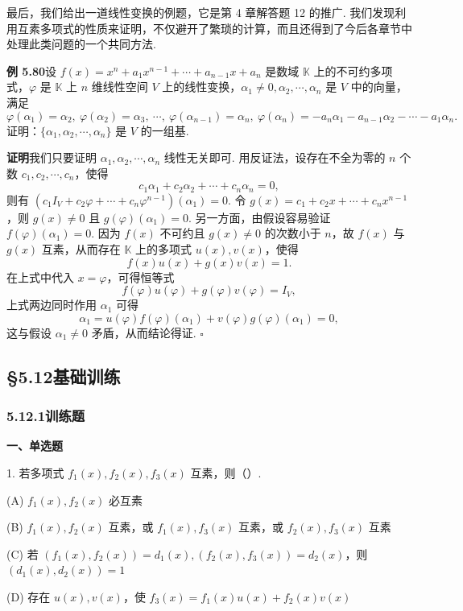 \documentclass[UTF8,12pt,a4paper,fontset=fandol]{ctexart}
\begin{document}
最后，我们给出一道线性变换的例题，它是第 4 章解答题 12 的推广. 我们发现利用互素多项式的性质来证明，不仅避开了繁琐的计算，而且还得到了今后各章节中处理此类问题的一个共同方法.

\noindent\textbf{例 5.80}\quad 设 $f(x)=x^n+a_1x^{n-1}+\cdots+a_{n-1}x+a_n$ 是数域 $\mathbb{K}$ 上的不可约多项式，$\varphi$ 是 $\mathbb{K}$ 上 $n$ 维线性空间 $V$ 上的线性变换，$\alpha_1\ne0,\alpha_2,\cdots,\alpha_n$ 是 $V$ 中的向量，满足
\[
\varphi(\alpha_1)=\alpha_2,\ \varphi(\alpha_2)=\alpha_3,\ \cdots,\ \varphi(\alpha_{n-1})=\alpha_n,\ \varphi(\alpha_n)=-a_n\alpha_1-a_{n-1}\alpha_2-\cdots-a_1\alpha_n.
\]
证明：$\{\alpha_1,\alpha_2,\cdots,\alpha_n\}$ 是 $V$ 的一组基.

\noindent\textbf{证明}\quad 我们只要证明 $\alpha_1,\alpha_2,\cdots,\alpha_n$ 线性无关即可. 用反证法，设存在不全为零的 $n$ 个数 $c_1,c_2,\cdots,c_n$，使得
\[
c_1\alpha_1+c_2\alpha_2+\cdots+c_n\alpha_n=0,
\]
则有 $(c_1I_V+c_2\varphi+\cdots+c_n\varphi^{n-1})(\alpha_1)=0$. 令 $g(x)=c_1+c_2x+\cdots+c_nx^{n-1}$，则 $g(x)\ne0$ 且 $g(\varphi)(\alpha_1)=0$. 另一方面，由假设容易验证 $f(\varphi)(\alpha_1)=0$. 因为 $f(x)$ 不可约且 $g(x)\ne0$ 的次数小于 $n$，故 $f(x)$ 与 $g(x)$ 互素，从而存在 $\mathbb{K}$ 上的多项式 $u(x),v(x)$，使得
\[
f(x)u(x)+g(x)v(x)=1.
\]
在上式中代入 $x=\varphi$，可得恒等式
\[
f(\varphi)u(\varphi)+g(\varphi)v(\varphi)=I_V,
\]
上式两边同时作用 $\alpha_1$ 可得
\[
\alpha_1=u(\varphi)f(\varphi)(\alpha_1)+v(\varphi)g(\varphi)(\alpha_1)=0,
\]
这与假设 $\alpha_1\ne0$ 矛盾，从而结论得证. \hfill $\square$

\subsection*{§5.12\quad 基础训练}

\subsubsection*{5.12.1\quad 训练题}

\noindent\textbf{一、单选题}

1. 若多项式 $f_1(x),f_2(x),f_3(x)$ 互素，则（\quad ）.

(A) $f_1(x),f_2(x)$ 必互素

(B) $f_1(x),f_2(x)$ 互素，或 $f_1(x),f_3(x)$ 互素，或 $f_2(x),f_3(x)$ 互素

(C) 若 $(f_1(x),f_2(x))=d_1(x),(f_2(x),f_3(x))=d_2(x)$，则 $(d_1(x),d_2(x))=1$

(D) 存在 $u(x),v(x)$，使 $f_3(x)=f_1(x)u(x)+f_2(x)v(x)$
\end{document}
